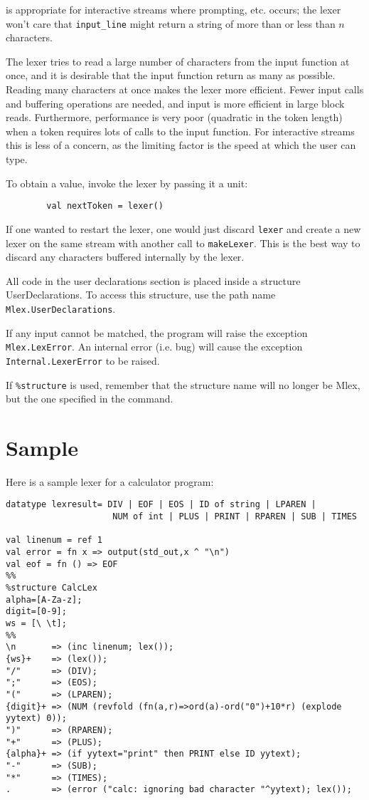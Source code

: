 is appropriate for interactive streams where prompting, etc.  occurs;
the lexer won't care that \verb|input_line| might return a string of more
than or less than $n$ characters.

The lexer tries to read a large number of characters from the input
function at once, and it is desirable that the input function return
as many as possible.  Reading many characters at once makes the lexer
more efficient.  Fewer input calls and buffering operations are
needed, and input is more efficient in large block reads.
Furthermore, performance is very poor (quadratic in the token length)
when a token requires lots of calls to the input function. For 
interactive streams this is less of a concern, as the limiting factor
is the speed at which the user can type.

To obtain a value, invoke the lexer by passing it a unit:

\begin{verbatim}
        val nextToken = lexer()
\end{verbatim}

If one wanted to restart the lexer, one would just discard {\tt lexer}
and create a new lexer on the same stream with another call to
{\tt makeLexer}.  This is the best way to discard any characters buffered
internally by the lexer.

All code in the user declarations section is placed inside a
structure UserDeclarations.  To access this structure, use the path name
{\tt Mlex.UserDeclarations}.

If any input cannot be matched, the program will raise the exception
{\tt Mlex.LexError}.  An internal error (i.e.  bug) will cause the
exception {\tt Internal.LexerError} to be raised.

If {\tt \%structure} is used, remember that the structure name will no
longer be Mlex, but the one specified in the command.

\section{Sample}

Here is a sample lexer for a calculator program:

\small
\begin{verbatim}
datatype lexresult= DIV | EOF | EOS | ID of string | LPAREN |
                     NUM of int | PLUS | PRINT | RPAREN | SUB | TIMES 

val linenum = ref 1
val error = fn x => output(std_out,x ^ "\n")
val eof = fn () => EOF
%%
%structure CalcLex
alpha=[A-Za-z];
digit=[0-9];
ws = [\ \t];
%%
\n       => (inc linenum; lex());
{ws}+    => (lex());
"/"      => (DIV);
";"      => (EOS);
"("      => (LPAREN);
{digit}+ => (NUM (revfold (fn(a,r)=>ord(a)-ord("0")+10*r) (explode yytext) 0));
")"      => (RPAREN);
"+"      => (PLUS);
{alpha}+ => (if yytext="print" then PRINT else ID yytext);
"-"      => (SUB);
"*"      => (TIMES);
.        => (error ("calc: ignoring bad character "^yytext); lex());
\end{verbatim}


